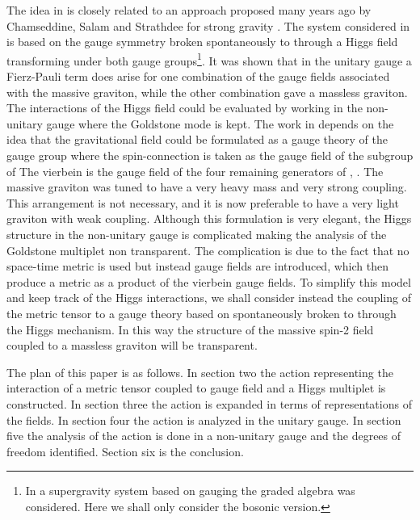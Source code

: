 \documentclass[a4paper,12pt]{article}
\begin{document}
The idea in \cite{ags} is closely related to an approach proposed many years
ago by Chamseddine, Salam and Strathdee \cite{css} for strong gravity
\cite{iss}. The system considered in \cite{css} is based on the gauge symmetry
\coordHE{} broken spontaneously to \coordHE{} through a Higgs field
transforming under both gauge groups\footnote[1]{In \cite{css} a supergravity
system based on gauging the graded algebra \coordHE{} was
considered. Here we shall only consider the bosonic version.}. It was shown
that in the unitary gauge a Fierz-Pauli term does arise for one combination of
the gauge fields associated with the massive graviton, while the other
combination gave a massless graviton. The interactions of the Higgs field
could be evaluated by working in the non-unitary gauge where the Goldstone
mode is kept. The work in \cite{css} depends on the idea that the
gravitational field could be formulated as a gauge theory of the \coordHE{} gauge
group where the spin-connection is taken as the gauge field of the \coordHE{}
subgroup of \coordHE{} The vierbein is the gauge field of the four remaining
generators of \coordHE{} \cite{cho}, \cite{ch}. The massive graviton was tuned to
have a very heavy mass and very strong coupling. This arrangement is not
necessary, and it is now preferable to have a very light graviton with weak
coupling. Although this formulation is very elegant, the Higgs structure in
the non-unitary gauge is complicated making the analysis of the Goldstone
multiplet non transparent. The complication is due to the fact that no
space-time metric is used but instead gauge fields are introduced, which then
produce a metric as a product of the vierbein gauge fields. To simplify this
model and keep track of the Higgs interactions, we shall consider instead the
coupling of the metric tensor to a gauge theory based on \coordHE{} spontaneously
broken to \coordHE{} through the Higgs mechanism. In this way the structure of
the massive spin-2 field coupled to a massless graviton will be transparent.

The plan of this paper is as follows. In section two the action representing
the interaction of a metric tensor coupled to \coordHE{} gauge field and a Higgs
multiplet is constructed. In section three the action is expanded in terms of
\coordHE{} representations of the \coordHE{} fields. In section four the action is
analyzed in the unitary gauge. In section five the analysis of the action is
done in a non-unitary gauge and the degrees of freedom identified. Section six
is the conclusion.
\end{document}
